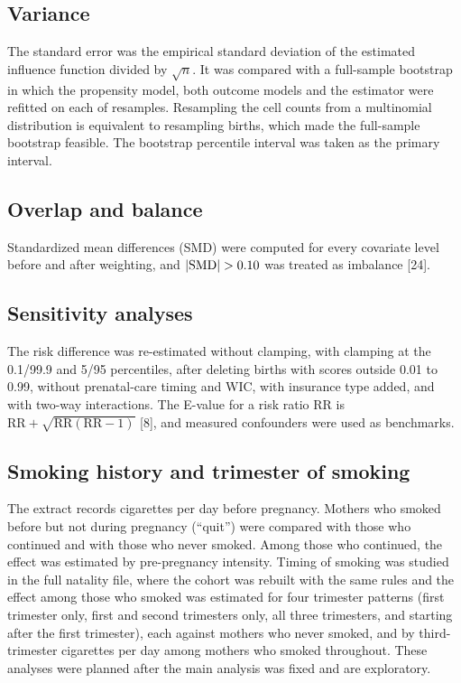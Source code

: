 \documentclass[11pt,letterpaper]{article}
\begin{document}
\subsection*{Variance}
The standard error was the empirical standard deviation of the estimated influence function divided by $\sqrt n$. It was compared with a full-sample bootstrap in which the propensity model, both outcome models and the estimator were refitted on each of \BootB{} resamples. Resampling the cell counts from a multinomial distribution is equivalent to resampling births, which made the full-sample bootstrap feasible. The bootstrap percentile interval was taken as the primary interval.

\subsection*{Overlap and balance}
Standardized mean differences (SMD) were computed for every covariate level before and after weighting, and $|{\rm SMD}|>0.10$ was treated as imbalance [24].

\subsection*{Sensitivity analyses}
The risk difference was re-estimated without clamping, with clamping at the 0.1/99.9 and 5/95 percentiles, after deleting births with scores outside 0.01 to 0.99, without prenatal-care timing and WIC, with insurance type added, and with two-way interactions. The E-value for a risk ratio $\mathrm{RR}$ is $\mathrm{RR}+\sqrt{\mathrm{RR}(\mathrm{RR}-1)}$ [8], and measured confounders were used as benchmarks.

\subsection*{Smoking history and trimester of smoking}
The extract records cigarettes per day before pregnancy. Mothers who smoked before but not during pregnancy (``quit'') were compared with those who continued and with those who never smoked. Among those who continued, the effect was estimated by pre-pregnancy intensity. Timing of smoking was studied in the full natality file, where the cohort was rebuilt with the same rules and the effect among those who smoked was estimated for four trimester patterns (first trimester only, first and second trimesters only, all three trimesters, and starting after the first trimester), each against mothers who never smoked, and by third-trimester cigarettes per day among mothers who smoked throughout. These analyses were planned after the main analysis was fixed and are exploratory.
\end{document}
